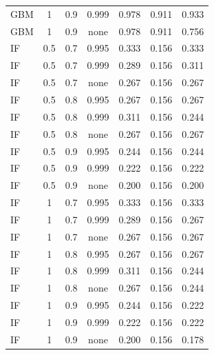 \documentclass[10pt,onecolumn,letterpaper]{article}
\begin{document}
\begin{table}[!t]
{\begin{tabular}{lcccccc}
GBM & 1 & 0.9 & 0.999 & 0.978 & 0.911 & 0.933 \\
GBM & 1 & 0.9 & none & 0.978 & 0.911 & 0.756 \\
IF & 0.5 & 0.7 & 0.995 & 0.333 & 0.156 & 0.333 \\
IF & 0.5 & 0.7 & 0.999 & 0.289 & 0.156 & 0.311 \\
IF & 0.5 & 0.7 & none & 0.267 & 0.156 & 0.267 \\
IF & 0.5 & 0.8 & 0.995 & 0.267 & 0.156 & 0.267 \\
IF & 0.5 & 0.8 & 0.999 & 0.311 & 0.156 & 0.244 \\
IF & 0.5 & 0.8 & none & 0.267 & 0.156 & 0.267 \\
IF & 0.5 & 0.9 & 0.995 & 0.244 & 0.156 & 0.244 \\
IF & 0.5 & 0.9 & 0.999 & 0.222 & 0.156 & 0.222 \\
IF & 0.5 & 0.9 & none & 0.200 & 0.156 & 0.200 \\
IF & 1 & 0.7 & 0.995 & 0.333 & 0.156 & 0.333 \\
IF & 1 & 0.7 & 0.999 & 0.289 & 0.156 & 0.267 \\
IF & 1 & 0.7 & none & 0.267 & 0.156 & 0.267 \\
IF & 1 & 0.8 & 0.995 & 0.267 & 0.156 & 0.267 \\
IF & 1 & 0.8 & 0.999 & 0.311 & 0.156 & 0.244 \\
IF & 1 & 0.8 & none & 0.267 & 0.156 & 0.244 \\
IF & 1 & 0.9 & 0.995 & 0.244 & 0.156 & 0.222 \\
IF & 1 & 0.9 & 0.999 & 0.222 & 0.156 & 0.222 \\
IF & 1 & 0.9 & none & 0.200 & 0.156 & 0.178 \\
\bottomrule
\end{tabular}}
\end{table}
\end{document}
